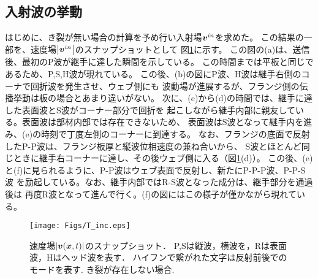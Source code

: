 \subsection{入射波の挙動}
はじめに、き裂が無い場合の計算を予め行い入射場$\mbox{\boldmath $v$}^{in}$を求めた。
この結果の一部を、速度場$\left| \mbox{\boldmath $v$}^{in}\right|$のスナップショットとして
図\ref{fig:fig3_5}に示す。
この図の(a)は、送信後、最初のP波が継手に達した瞬間を示している。
この時間までは平板と同じであるため、P,S,H波が現れている。
この後、(b)の図にP波、H波は継手右側のコーナで回折波を発生させ、ウェブ側にも
波動場が進展するが、フランジ側の伝播挙動は板の場合とあまり違いがない。
次に、(c)から(d)の時間では、継手に達した表面波とS波がコーナー部分で回折を
起こしながら継手内部に親友している。表面波は部材内部では存在できないため、
表面波はS波となって継手内を進み、(e)の時刻で丁度左側のコーナーに到達する。
なお、フランジの底面で反射したP-P波は、フランジ板厚と縦波位相速度の兼ね合いから、
S波とほとんど同じときに継手右コーナーに達し、その後ウェブ側に入る（図\ref{fig:fig3_5}(d)）。
この後、(e)と(f)に見られるように、P-P波はウェブ表面で反射し、新たにP-P-P波、P-P-S波
を励起している。なお、継手内部ではR-S波となった成分は、継手部分を通過後は
再度R波となって進んで行く。(f)の図にはこの様子が僅かながら現れている。
\begin{figure}[h]
	\begin{center}
	\texttt{[image: Figs/T\_inc.eps]} 
	\end{center}
	\caption{
		速度場$|\mbox{\boldmath $v$}(\mbox{\boldmath $x$},t)|$のスナップショット．
		P,Sは縦波，横波を，Rは表面波，Hはヘッド波を表す．
		ハイフンで繋がれた文字は反射前後でのモードを表す. き裂が存在しない場合.
	} 
	\label{fig:fig3_5}
\end{figure}
